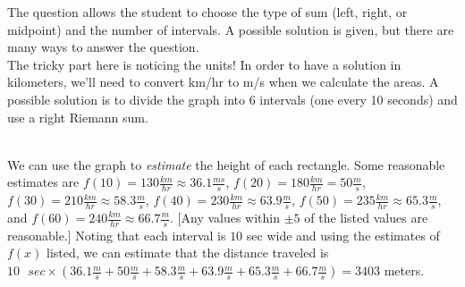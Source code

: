 \begin{Answer}[ref=rsum4]
The question allows the student to choose the type of sum (left, right, or midpoint) and the number of intervals. A possible solution is given, but there are many ways to answer the question.\\
The tricky part here is noticing the units! In order to have a solution in kilometers, we'll need to convert km/hr to m/s when we calculate the areas. A possible solution is to divide the graph into 6 intervals (one every 10 seconds) and use a right Riemann sum.

\\
We can use the graph to \textit{estimate} the height of each rectangle. Some reasonable estimates are $f(10) = 130\frac{km}{hr}\approx36.1\frac{ms}{s}$, $f(20) = 180\frac{km}{hr}=50\frac{m}{s}$, $f(30) = 210\frac{km}{hr}\approx58.3\frac{m}{s}$, $f(40) = 230\frac{km}{hr}\approx63.9\frac{m}{s}$, $f(50) = 235\frac{km}{hr}\approx65.3\frac{m}{s}$, and $f(60) = 240\frac{km}{hr}\approx66.7\frac{m}{s}$. [Any values within $\pm5$ of the listed values are reasonable.] Noting that each interval is $10$ sec wide and using the estimates of $f(x)$ listed, we can estimate that the distance traveled is $10\text{ }sec\times(36.1\frac{m}{s}+50\frac{m}{s}+58.3\frac{m}{s}+63.9\frac{m}{s}+65.3\frac{m}{s}+66.7\frac{m}{s})=3403$ meters.
\end{Answer}